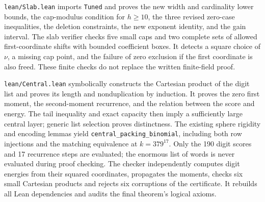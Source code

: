 \documentclass[11pt]{article}
\begin{document}
\texttt{lean/Slab.lean} imports \texttt{Tuned} and proves the new
width and cardinality lower bounds, the cap-modulus condition for
\(h\ge10\), the three revised zero-case inequalities, the deletion
constraints, the new exponent identity, and the gain interval.
The slab verifier checks five small caps and two complete sets of
allowed first-coordinate shifts with bounded coefficient boxes.
It detects a square choice of \(\nu\), a missing cap point, and the
failure of zero exclusion if the first coordinate is also freed.
These finite checks do not replace the written finite-field proof.

\texttt{lean/Central.lean} symbolically constructs the Cartesian product
of the digit list and proves its length and nonduplication by induction.
It proves the zero first moment, the second-moment recurrence, and the
relation between the score and energy. The tail inequality and exact
capacity then imply a sufficiently large central layer; generic list
selection proves distinctness. The existing sphere rigidity and encoding
lemmas yield \texttt{central\_packing\_binomial}, including both row
injections and the matching equivalence at \(k=379^{17}\).
Only the 190 digit scores and 17 recurrence steps are evaluated;
the enormous list of words is never evaluated during proof checking.
The checker independently computes digit energies from their squared
coordinates, propagates the moments, checks six small Cartesian products
and rejects six corruptions of the certificate. It rebuilds all Lean
dependencies and audits the final theorem's logical axioms.
\end{document}
